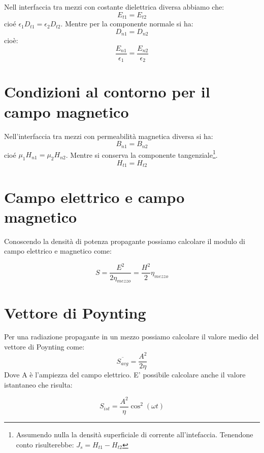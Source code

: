 \documentclass[10pt,a4paper]{report}
\begin{document}
		Nell interfaccia tra mezzi con costante dielettrica diversa abbiamo che:
		\begin{equation}
		E_{t1}=E_{t2} 
		\end{equation}
		cioé $\epsilon_1 D_{t1} = \epsilon_2 D_{t2}$.
		Mentre per la componente normale si ha:
		\begin{equation}
		D_{n1} = D_{n2}
		\end{equation}
		cioè:
		\[
		\frac{E_{n1}}{\epsilon_1}=\frac{E_{n2}}{\epsilon_2}
		\]

	\section{Condizioni al contorno per il campo magnetico}
		Nell'interfaccia tra mezzi con permeabilità magnetica diversa si ha:
		\begin{equation}
		B_{n1}=B_{n2} 
		\end{equation}
		cioé $\mu_1 H_{n1} = \mu_2 H_{n2}$.
		Mentre si conserva la componente tangenziale\footnote{Assumendo nulla la densità superficiale di corrente all'intefaccia. Tenendone conto risulterebbe: $J_s=H_{t1}-H_{t2}$}.
		\begin{equation}
		H_{t1}=H_{t2}
		\end{equation}

	\section{Campo elettrico e campo magnetico}

	Conoscendo la densità di potenza propagante possiamo calcolare il modulo di campo elettrico e magnetico come:

	\[
	S=\frac{E^2}{2\eta_{mezzo}}=\frac{H^2}{2}\eta_{mezzo}
	\]

	\section{Vettore di Poynting}
		Per una radiazione propagante in un mezzo possiamo calcolare il valore medio del vettore di Poynting come:
		\begin{equation}
		\overline{S_{avg}}=\frac{A^2}{2\eta}
		\end{equation}
		Dove A è l'ampiezza del campo elettrico.
		E' possibile calcolare anche il valore istantaneo che risulta:

		\begin{equation}
		S_{ist}=\frac{A^2}{\eta}\cos^2(\omega t)
		\end{equation}
	
\end{document}
